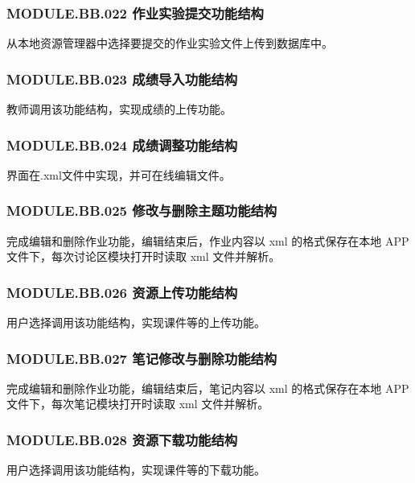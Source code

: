 \subsubsection{MODULE.BB.022    作业实验提交功能结构}
从本地资源管理器中选择要提交的作业实验文件上传到数据库中。

\subsubsection{MODULE.BB.023    成绩导入功能结构}
教师调用该功能结构，实现成绩的上传功能。

\subsubsection{MODULE.BB.024    成绩调整功能结构}
界面在.xml文件中实现，并可在线编辑文件。

\subsubsection{MODULE.BB.025    修改与删除主题功能结构}
完成编辑和删除作业功能，编辑结束后，作业内容以 xml 的格式保存在本地 APP 文件下，每次讨论区模块打开时读取 xml 文件并解析。

\subsubsection{MODULE.BB.026    资源上传功能结构}
用户选择调用该功能结构，实现课件等的上传功能。

\subsubsection{MODULE.BB.027    笔记修改与删除功能结构}
完成编辑和删除作业功能，编辑结束后，笔记内容以 xml 的格式保存在本地 APP 文件下，每次笔记模块打开时读取 xml 文件并解析。

\subsubsection{MODULE.BB.028    资源下载功能结构}
用户选择调用该功能结构，实现课件等的下载功能。


